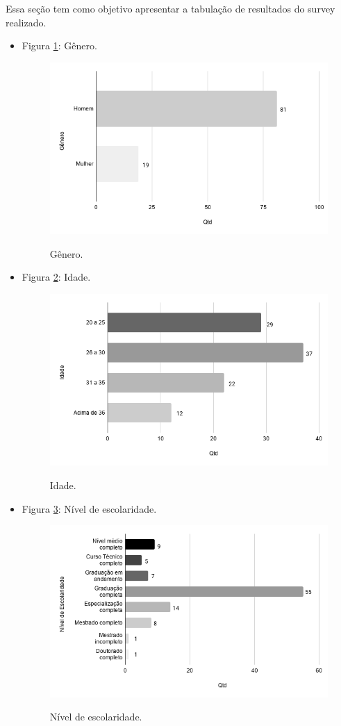 \label{sec:resultadospesquisa}


Essa seção tem como objetivo apresentar a tabulação de resultados do survey realizado.

\begin{itemize}

    \item Figura \ref{figure:s_genero}: Gênero.
    \begin{figure}[!htb]
    \centering
    \includegraphics[width=.55\textwidth]{images/s_genero.png}
    \label{figure:s_genero}
    \caption{Gênero.}
    \end{figure}
    
    
    \item Figura \ref{figure:s_idade}: Idade.
    \begin{figure}[!htb]
    \centering
    \includegraphics[width=.55\textwidth]{images/s_idade.png}
    \label{figure:s_idade}
    \caption{Idade.}
    \end{figure}
    
    
    \item Figura \ref{figure:s_escolaridade}: Nível de escolaridade.
    \begin{figure}[!htb]
    \centering
    \includegraphics[width=.55\textwidth]{images/s_escolaridade.png}
    \label{figure:s_escolaridade}
    \caption{Nível de escolaridade.}
    \end{figure}
    

\end{itemize}
